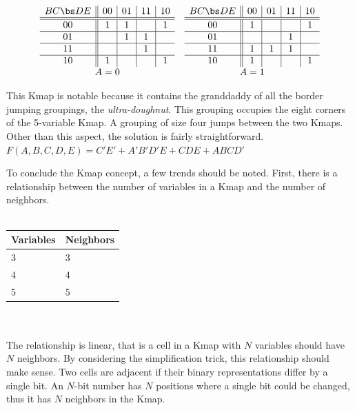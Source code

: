 \begin{process:minimizationKmap}
$$\begin{array}{cc} 
\begin{array} {c||c|c|c|c}
	BC \bs DE & 00 & 01 & 11 & 10 \\ \hline \hline
	00        & 1  & 1  &    & 1  \\ \hline
	01        &    & 1  & 1  &    \\ \hline
	11        &    &    & 1  &    \\ \hline
	10        & 1  &    &    & 1  \\ 
\end{array}
&
\begin{array} {c||c|c|c|c}
	BC \bs DE & 00 & 01 & 11 & 10 \\ \hline \hline
	00        & 1  &    &    & 1  \\ \hline
	01        &    &    & 1  &    \\ \hline
	11        & 1  & 1  & 1  &    \\ \hline
	10        & 1  &    &    & 1  \\ 
\end{array} \\
A=0 & A=1 \\
\end{array}
$$

This Kmap is notable because it contains the granddaddy of all the
border jumping groupings, the  {\it ultra-doughnut}.  
This grouping occupies the eight corners of the 5-variable Kmap.  
A grouping of size four jumps between the two Kmaps.  
Other than this aspect, the solution is fairly straightforward.
$F(A,B,C,D,E)=C'E'+A'B'D'E+CDE+ABCD'$

To conclude the Kmap concept, a few trends 
should be noted.  First, there is a relationship between the
number of variables in a Kmap and the number of neighbors.
\\ \\
\begin{tabular}{l|l}
Variables & Neighbors	\\ \hline
3	  &  3		\\ \hline
4	  &  4		\\ \hline
5	  &  5		\\ 
\end{tabular}
\\ \\
The relationship is linear, that is a cell in a Kmap with 
$N$ variables should have $N$ neighbors.   By considering
the simplification trick, this relationship should make sense. Two cells
are adjacent if their binary representations differ by a single
bit.  An $N$-bit number has $N$ positions where a single bit
could be changed, thus it has $N$ neighbors in the Kmap.  


\end{process:minimizationKmap}
